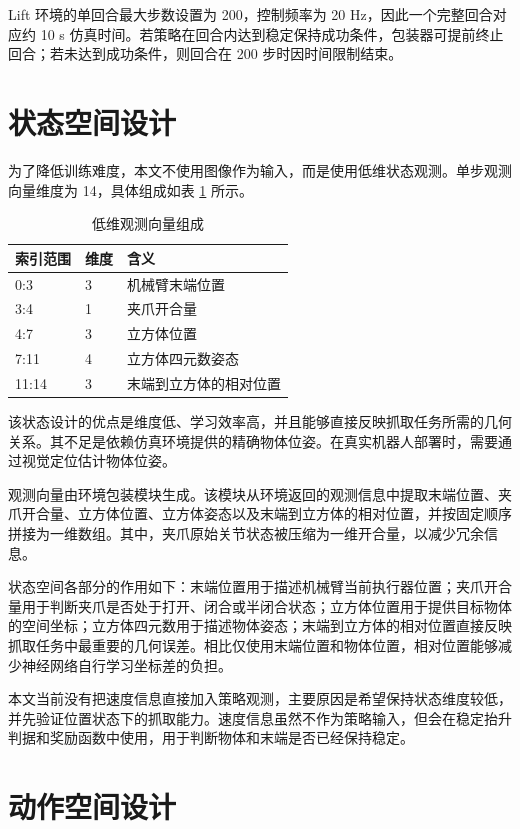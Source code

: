 \documentclass[
    type = bachelor,
    oneside,
    fontset = fandol
]{njuthesis}
\begin{document}
Lift 环境的单回合最大步数设置为 200，控制频率为 20 Hz，因此一个完整回合对应约 10 s 仿真时间。若策略在回合内达到稳定保持成功条件，包装器可提前终止回合；若未达到成功条件，则回合在 200 步时因时间限制结束。

\section{状态空间设计}

为了降低训练难度，本文不使用图像作为输入，而是使用低维状态观测。单步观测向量维度为 14，具体组成如表 \ref{tab:obs-space} 所示。

\begin{table}[htbp]
  \centering
  \caption{低维观测向量组成}
  \label{tab:obs-space}
  \begin{tabular}{lll}
    \toprule
    索引范围 & 维度 & 含义 \\
    \midrule
    0:3 & 3 & 机械臂末端位置 \\
    3:4 & 1 & 夹爪开合量 \\
    4:7 & 3 & 立方体位置 \\
    7:11 & 4 & 立方体四元数姿态 \\
    11:14 & 3 & 末端到立方体的相对位置 \\
    \bottomrule
  \end{tabular}
\end{table}

该状态设计的优点是维度低、学习效率高，并且能够直接反映抓取任务所需的几何关系。其不足是依赖仿真环境提供的精确物体位姿。在真实机器人部署时，需要通过视觉定位估计物体位姿。

观测向量由环境包装模块生成。该模块从环境返回的观测信息中提取末端位置、夹爪开合量、立方体位置、立方体姿态以及末端到立方体的相对位置，并按固定顺序拼接为一维数组。其中，夹爪原始关节状态被压缩为一维开合量，以减少冗余信息。

状态空间各部分的作用如下：末端位置用于描述机械臂当前执行器位置；夹爪开合量用于判断夹爪是否处于打开、闭合或半闭合状态；立方体位置用于提供目标物体的空间坐标；立方体四元数用于描述物体姿态；末端到立方体的相对位置直接反映抓取任务中最重要的几何误差。相比仅使用末端位置和物体位置，相对位置能够减少神经网络自行学习坐标差的负担。

本文当前没有把速度信息直接加入策略观测，主要原因是希望保持状态维度较低，并先验证位置状态下的抓取能力。速度信息虽然不作为策略输入，但会在稳定抬升判据和奖励函数中使用，用于判断物体和末端是否已经保持稳定。

\section{动作空间设计}
\end{document}
